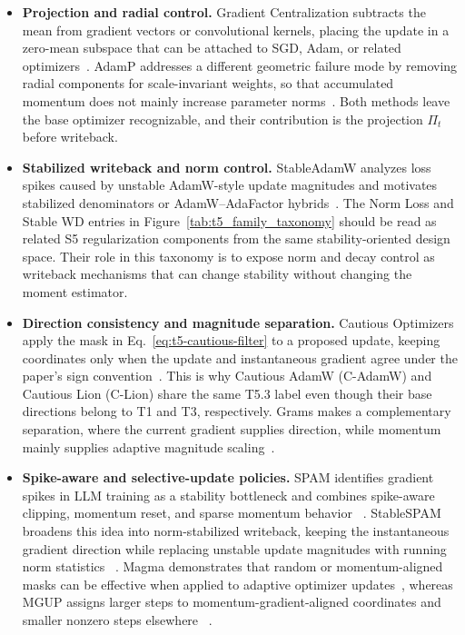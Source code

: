 \begin{itemize}
  \setlength{\itemsep}{2pt}
  \item \textbf{Projection and radial control.}  Gradient Centralization
  subtracts the mean from gradient vectors or convolutional kernels, placing
  the update in a zero-mean subspace that can be attached to SGD, Adam, or
  related optimizers~\citep{yong2020gradient}.  AdamP addresses a different
  geometric failure mode by removing radial components for
  scale-invariant weights, so that accumulated momentum does not mainly increase parameter
  norms~\citep{heo2020adamp}.  Both methods leave the base optimizer
  recognizable, and their contribution is the projection $\Pi_t$ before writeback.
  \item \textbf{Stabilized writeback and norm control.}  StableAdamW analyzes
  loss spikes caused by unstable AdamW-style update magnitudes and motivates
  stabilized denominators or AdamW--AdaFactor hybrids~\citep{wortsman2023stable}.
  The Norm Loss and Stable WD entries in Figure~\ref{tab:t5_family_taxonomy}
  should be read as related S5 regularization components from the same
  stability-oriented design space.  Their
  role in this taxonomy is to expose norm and decay control as writeback
  mechanisms that can change stability without changing the moment estimator.
  \item \textbf{Direction consistency and magnitude separation.}  Cautious
  Optimizers apply the mask in Eq.~\eqref{eq:t5-cautious-filter} to a proposed
  update, keeping coordinates only when the update and instantaneous gradient
  agree under the paper's sign convention~\citep{liang2024cautious}.  This is
  why Cautious AdamW (C-AdamW) and Cautious Lion (C-Lion) share the same T5.3
  label even though their base directions belong to T1 and T3, respectively.  Grams makes a complementary
  separation, where the current gradient supplies direction, while momentum mainly
  supplies adaptive magnitude scaling~\citep{cao2024grams}.
  \item \textbf{Spike-aware and selective-update policies.}  SPAM identifies
  gradient spikes in LLM training as a stability bottleneck and combines
  spike-aware clipping, momentum reset, and sparse momentum behavior
  ~\citep{huang2025spam}.  StableSPAM broadens this idea into norm-stabilized
  writeback, keeping the instantaneous gradient direction while replacing
  unstable update magnitudes with running norm statistics
  ~\citep{huanggradientstabilizer}.  Magma demonstrates that random or
  momentum-aligned masks can be effective when applied to adaptive optimizer
  updates~\citep{joo2026surprising}, whereas MGUP assigns larger steps to
  momentum-gradient-aligned coordinates and smaller nonzero steps elsewhere
  ~\citep{chang2026mgup}.
\end{itemize}

